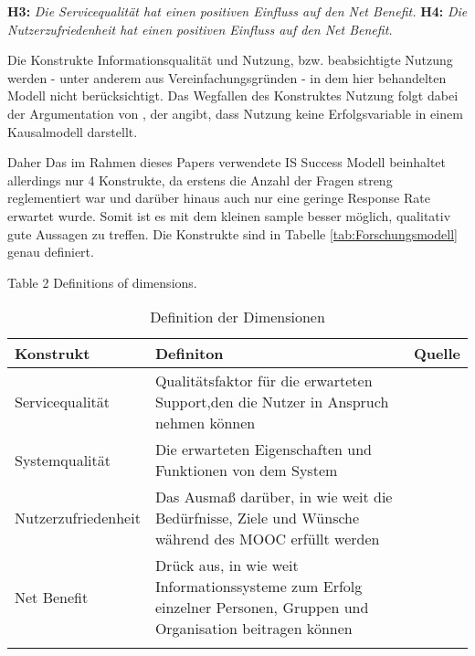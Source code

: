 \textbf{H3:} \textit{Die Servicequalität hat einen positiven Einfluss auf den Net Benefit.} 
\textbf{H4:} \textit{Die Nutzerzufriedenheit hat einen positiven Einfluss auf den Net Benefit.} 

Die Konstrukte Informationsqualität und Nutzung, bzw. beabsichtigte Nutzung werden - unter anderem aus Vereinfachungsgründen - in dem hier behandelten Modell nicht berücksichtigt. Das Wegfallen des Konstruktes Nutzung folgt dabei der Argumentation von \cite{seddon1997respecification}, der angibt, dass Nutzung keine Erfolgsvariable in einem Kausalmodell darstellt. 

Daher 
Das im Rahmen dieses Papers verwendete IS Success Modell beinhaltet allerdings nur 4 Konstrukte, da erstens die Anzahl der Fragen streng reglementiert war und darüber hinaus auch nur eine geringe Response Rate erwartet wurde. Somit ist es mit dem kleinen sample besser möglich, qualitativ gute Aussagen zu treffen. Die Konstrukte sind in Tabelle \ref{tab:Forschungsmodell} genau definiert.


Table 2
Definitions of dimensions.

\begin{table}[ht] 
\footnotesize
\caption{Definition der Dimensionen}
\label{tab:Dimensionen} 
\begin{tabular}{@{}lp{9cm}l@{}} \toprule

\textbf{Konstrukt} & \textbf{Definiton} & \textbf{Quelle} \\ \midrule


Servicequalität & Qualitätsfaktor für die erwarteten Support,den die Nutzer in Anspruch nehmen können & \parbox[t]{4cm}{\cite{petter2008measuring}}\\ 
Systemqualität & Die erwarteten Eigenschaften und Funktionen von dem System & \parbox[t]{4cm}{\cite{petter2008measuring}}\\ Nutzerzufriedenheit & Das Ausmaß darüber, in wie weit die Bedürfnisse, Ziele und Wünsche während des MOOC erfüllt werden & \parbox[t]{4cm}{\cite{sanchez2009moderating}}\\ 
Net Benefit & \parbox[t]{9cm}{Drück aus, in wie weit Informationssysteme zum Erfolg einzelner Personen, Gruppen und Organisation beitragen können}  & \parbox[t]{4cm}{\cite{conf/gi/GemlikNSB10} \cite{Petter:0aa} }\\ \addlinespace 
  \bottomrule

\end{tabular}	
\end{table}


